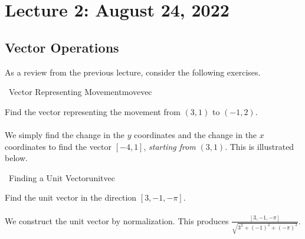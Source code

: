 \pagebreak

\section{Lecture 2: August 24, 2022}

    \subsection{Vector Operations}

    As a review from the previous lecture, consider the following exercises.
    \begin{example}{\Difficulty\,\Difficulty\,\,Vector Representing Movement}{movevec}

        Find the vector representing the movement from \((3,1)\) to \((-1,2)\).
        \\
        \\
        We simply find the change in the \(y\) coordinates and the change in the \(x\) coordinates to find the vector \([-4, 1]\), \textit{starting from} \((3,1)\). This is illustrated below.
        \begin{center}
        \end{center}
        
    \end{example}
    \begin{example}{\Difficulty\,\Difficulty\,\,Finding a Unit Vector}{unitvec}

        Find the unit vector in the direction \([3,-1,-\pi]\).
        \\
        \\
        We construct the unit vector by normalization. This produces \(\frac{[3,-1,-\pi]}{\sqrt{3^2+(-1)^2+(-\pi)^2}}\).
    
    \end{example}
